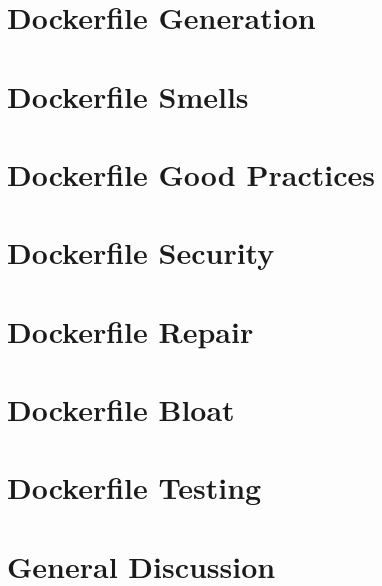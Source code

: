 \section{Dockerfile Generation} \label{dockerfile_generation}
\section{Dockerfile Smells} \label{dockerfile_smells}
\section{Dockerfile Good Practices} \label{dockerfile_good_practices}
\section{Dockerfile Security} \label{dockerfile_security}
\section{Dockerfile Repair} \label{dockerfile_repair}
\section{Dockerfile Bloat} \label{dockerfile_bloat}
\section{Dockerfile Testing} \label{dockerfile_testing}




\section{General Discussion} \label{general_discussion}






